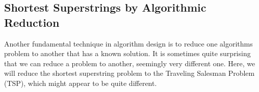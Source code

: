 











\subsection{Shortest Superstrings by Algorithmic Reduction}
\label{genome::alg::reduction-tsp}

\begin{gram}
Another fundamental technique in algorithm design is to reduce one
algorithms problem to another that has a known solution.
%
It is sometimes quite surprising that we can reduce a problem to
another, seemingly very different one.
%
Here, we will reduce the shortest superstring problem to the Traveling
Salesman Problem  (TSP), which might appear to be quite different.
\end{gram}

